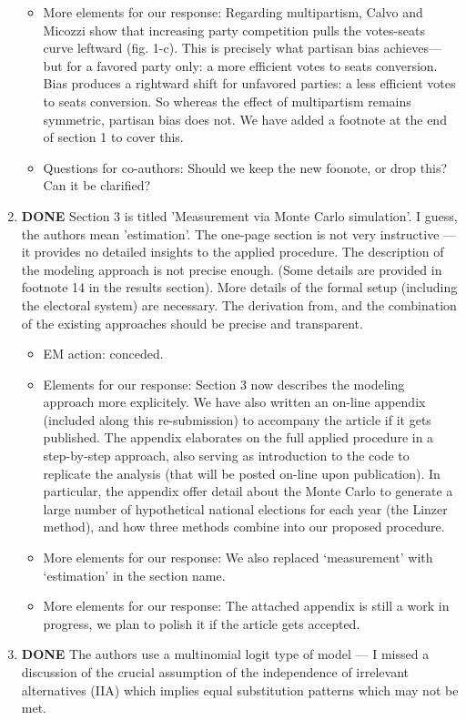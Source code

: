 \documentclass{article}
\begin{document}
\begin{enumerate}
\begin{itemize}
\item More elements for our response: Regarding multipartism, Calvo and Micozzi show that increasing party competition pulls the votes-seats curve leftward (fig. 1-c). This is precisely what partisan bias achieves---but for a favored party only: a more efficient votes to seats conversion. Bias produces a rightward shift for unfavored parties: a less efficient votes to seats conversion. So whereas the effect of multipartism remains symmetric, partisan bias does not. We have added a footnote at the end of section 1 to cover this.
\item Questions for co-authors: Should we keep the new foonote, or drop this? Can it be clarified?
\end{itemize}
\item {\bfseries\sffamily DONE} Section 3 is titled 'Measurement via Monte Carlo simulation'. I guess, the authors mean 'estimation'. The one-page section is not very instructive --- it provides no detailed insights to the applied procedure. The description of the modeling approach is not precise enough. (Some details are provided in footnote 14 in the results section).  More details of the formal setup (including the electoral system) are necessary. The derivation from, and the combination of the existing approaches should be precise and transparent.
\label{sec:orgheadline26}
\begin{itemize}
\item EM action: conceded.
\item Elements for our response: Section 3 now describes the modeling approach more explicitely. We have also written an on-line appendix (included along this re-submission) to accompany the article if it gets published. The appendix elaborates on the full applied procedure in a step-by-step approach, also serving as introduction to the code to replicate the analysis (that will be posted on-line upon publication). In particular, the appendix offer detail about the Monte Carlo to generate a large number of hypothetical national elections for each year (the Linzer method), and how three methods combine into our proposed procedure.
\item More elements for our response: We also replaced `measurement' with `estimation' in the section name.
\item More elements for our response: The attached appendix is still a work in progress, we plan to polish it if the article gets accepted.
\end{itemize}
\item {\bfseries\sffamily DONE} The authors use a multinomial logit type of model --- I missed a discussion of the crucial assumption of the independence of irrelevant alternatives (IIA) which implies equal substitution patterns which may not be met.

\end{enumerate}
\end{document}
